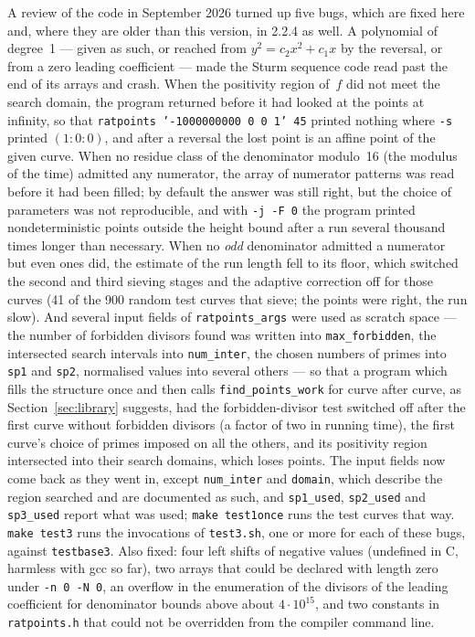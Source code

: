 \documentclass[12pt,a4paper,oneside]{amsart}
\begin{document}
A review of the code in September 2026 turned up five bugs, which are fixed
here and, where they are older than this version, in 2.2.4 as well. A
polynomial of degree~1 --- given as such, or reached from
$y^2 = c_2x^2 + c_1x$ by the reversal, or from a zero leading coefficient
--- made the Sturm sequence code read past the end of its arrays and crash.
When the positivity region of~$f$ did not meet the search domain, the
program returned before it had looked at the points at infinity, so that
\texttt{ratpoints '-1000000000 0 0 1' 45} printed nothing where
\verb+-s+ printed $(1:0:0)$, and after a reversal the lost point is an
affine point of the given curve. When no residue class of the denominator
modulo~16 (the modulus of the time) admitted any numerator, the array of numerator patterns was read
before it had been filled; by default the answer was still right, but the
choice of parameters was not reproducible, and with \verb+-j -F 0+ the
program printed nondeterministic points outside the height bound after a
run several thousand times longer than necessary. When no {\em odd}
denominator admitted a numerator but even ones did, the estimate of the
run length fell to its floor, which switched the second and third sieving
stages and the adaptive correction off for those curves (41 of the 900
random test curves that sieve; the points were right, the run slow). And
several input fields of \texttt{ratpoints\_args} were used as scratch
space --- the number of forbidden divisors found was written into
\texttt{max\_forbidden}, the intersected search intervals into
\texttt{num\_inter}, the chosen numbers of primes into \texttt{sp1} and
\texttt{sp2}, normalised values into several others --- so that a program
which fills the structure once and then calls \texttt{find\_points\_work}
for curve after curve, as Section~\ref{sec:library} suggests, had the
forbidden-divisor test switched off after the first curve without forbidden
divisors (a factor of two in running time), the first curve's choice of
primes imposed on all the others, and its positivity region intersected
into their search domains, which loses points. The input fields now come
back as they went in, except \texttt{num\_inter} and \texttt{domain}, which
describe the region searched and are documented as such, and
\texttt{sp1\_used}, \texttt{sp2\_used} and \texttt{sp3\_used} report what
was used; \texttt{make test1once} runs the test curves that way.
\texttt{make test3} runs the invocations of \texttt{test3.sh}, one or more
for each of these bugs, against \texttt{testbase3}.
Also fixed: four left shifts of negative values (undefined in C, harmless
with gcc so far), two arrays that could be declared with length zero under
\verb+-n 0 -N 0+, an overflow in the enumeration of the divisors of the
leading coefficient for denominator bounds above about $4\cdot10^{15}$, and
two constants in \texttt{ratpoints.h} that could not be overridden from the
compiler command line.
\end{document}
